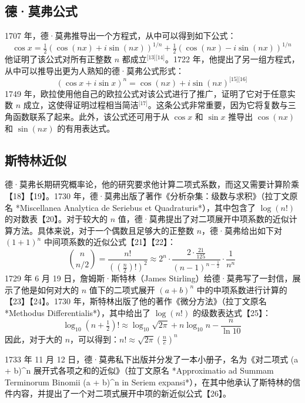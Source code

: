 \subsection{德·莫弗公式}
1707 年，德·莫弗推导出一个方程式，从中可以得到如下公式：
$$
\cos x = \tfrac{1}{2}(\cos(nx) + i\sin(nx))^{1/n} + \tfrac{1}{2}(\cos(nx) - i\sin(nx))^{1/n}~
$$
他证明了该公式对所有正整数 $n$ 都成立\(^\text{[13][14]}\)。1722 年，他提出了另一组方程式，从中可以推导出更为人熟知的德·莫弗公式形式：
$$
(\cos x + i \sin x)^n = \cos(nx) + i \sin(nx)
^\text{[15][16]}~
$$
1749 年，欧拉使用他自己的欧拉公式对该公式进行了推广，证明了它对于任意实数 \( n \) 成立，这使得证明过程相当简洁\(^\text{[17]}\)。这条公式非常重要，因为它将复数与三角函数联系了起来。此外，该公式还可用于从 \(\cos x\) 和 \(\sin x\) 推导出 \(\cos(nx)\) 和 \(\sin(nx)\) 的有用表达式。

\subsection{斯特林近似}

德·莫弗长期研究概率论，他的研究要求他计算二项式系数，而这又需要计算阶乘【18】【19】。1730 年，德·莫弗出版了著作《分析杂集：级数与求积》（拉丁文原名 *Miscellanea Analytica de Seriebus et Quadraturis*），其中包含了 $\log(n!)$ 的对数表【20】。对于较大的 $n$ 值，德·莫弗提出了对二项展开中项系数的近似计算方法。具体来说，对于一个偶数且足够大的正整数 $n$，德·莫弗给出如下对 $(1 + 1)^n$ 中间项系数的近似公式【21】【22】：
$$
\binom{n}{n/2} = \frac{n!}{\left(\left(\frac{n}{2}\right)!\right)^2} \approx 2^n \cdot \frac{2 \cdot \frac{21}{125}}{(n-1)^{n-\frac{1}{2}}} \cdot \frac{1}{n^n}~
$$
1729 年 6 月 19 日，詹姆斯·斯特林（James Stirling）给德·莫弗写了一封信，展示了他是如何对大的 $n$ 值下的二项式展开 $(a + b)^n$ 中的中项系数进行计算的【23】【24】。1730 年，斯特林出版了他的著作《微分方法》（拉丁文原名 *Methodus Differentialis*），其中给出了 $\log(n!)$ 的级数表达式【25】：
$$
\log_{10} \left(n + \tfrac{1}{2}\right)! \approx \log_{10} \sqrt{2\pi} + n \log_{10} n - \frac{n}{\ln 10}~
$$
因此，对于大的 $n$，可以得到：$n! \approx \sqrt{2\pi} \left(\frac{n}{e}\right)^n$

1733 年 11 月 12 日，德·莫弗私下出版并分发了一本小册子，名为《对二项式 (a + b)^n 展开式各项之和的近似》（拉丁文原名 *Approximatio ad Summam Terminorum Binomii (a + b)^n in Seriem expansi*），在其中他承认了斯特林的信件内容，并提出了一个对二项式展开中项的新近似公式【26】。
